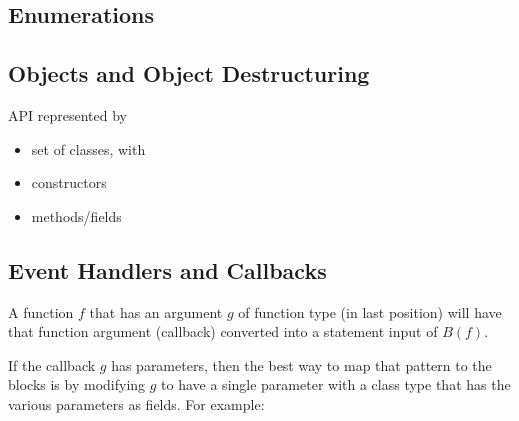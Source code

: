

\subsection{Enumerations}

\subsection{Objects and Object Destructuring}
API represented by
\begin{itemize}
  \item set of classes, with
  \item constructors
  \item methods/fields
\end{itemize}

\subsection{Event Handlers and Callbacks}


A function $f$ that has an argument $g$ of function type (in last position) will have
that function argument (callback) converted into a statement input of $B(f)$.

If the callback $g$ has parameters, then
the best way to map that pattern to the blocks is by modifying
$g$ to have a single parameter with a class type that has the
various parameters as fields.
For example:



